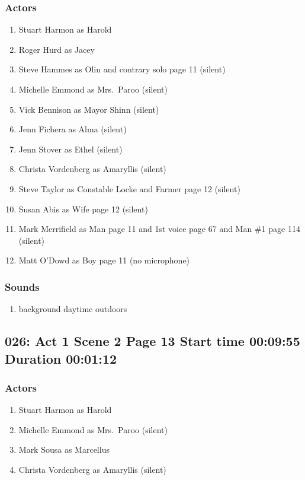 \subsubsection{Actors}
\begin{enumerate}
\item Stuart Harmon as Harold
\item Roger Hurd as Jacey
\item Steve Hammes as Olin and contrary solo page 11 (silent)
\item Michelle Emmond as Mrs.~Paroo (silent)
\item Vick Bennison as Mayor Shinn (silent)
\item Jenn Fichera as Alma (silent)
\item Jenn Stover as Ethel (silent)
\item Christa Vordenberg as Amaryllis (silent)
\item Steve Taylor as Constable Locke and Farmer page 12 (silent)
\item Susan Abis as Wife page 12 (silent)
\item Mark Merrifield as Man page 11 and 1st voice page 67 and Man \#1 page 114 (silent)
\item Matt O'Dowd as Boy page 11 (no microphone)
\end{enumerate}

\subsubsection{Sounds}
\begin{enumerate}
\item background daytime outdoors
\end{enumerate}
\subsection{026: Act 1 Scene 2 Page 13 Start time 00:09:55 Duration 00:01:12}

\subsubsection{Actors}
\begin{enumerate}
\item Stuart Harmon as Harold
\item Michelle Emmond as Mrs.~Paroo (silent)
\item Mark Sousa as Marcellus
\item Christa Vordenberg as Amaryllis (silent)
\end{enumerate}

